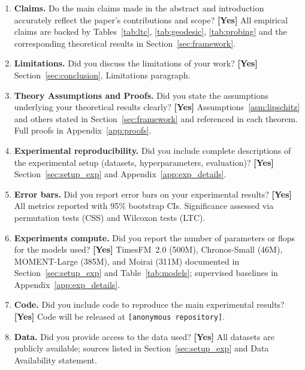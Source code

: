 \documentclass[10pt]{article}
\theoremstyle{definition}
\theoremstyle{remark}
\newcommand{\answerYes}[1]{\textbf{[Yes]} #1}
\begin{document}
\begin{enumerate}
  \setlength{\itemsep}{4pt}

\item \textbf{Claims.}
  Do the main claims made in the abstract and introduction accurately reflect
  the paper's contributions and scope?
  \answerYes{All empirical claims are backed by Tables~\ref{tab:ltc},
  \ref{tab:geodesic}, \ref{tab:probing} and the corresponding theoretical
  results in Section~\ref{sec:framework}.}

\item \textbf{Limitations.}
  Did you discuss the limitations of your work?
  \answerYes{Section~\ref{sec:conclusion}, Limitations paragraph.}

\item \textbf{Theory Assumptions and Proofs.}
  Did you state the assumptions underlying your theoretical results clearly?
  \answerYes{Assumptions~\ref{asm:lipschitz} and others stated in
  Section~\ref{sec:framework} and referenced in each theorem.
  Full proofs in Appendix~\ref{app:proofs}.}

\item \textbf{Experimental reproducibility.}
  Did you include complete descriptions of the experimental setup
  (datasets, hyperparameters, evaluation)?
  \answerYes{Section~\ref{sec:setup_exp} and Appendix~\ref{app:exp_details}.}

\item \textbf{Error bars.}
  Did you report error bars on your experimental results?
  \answerYes{All metrics reported with 95\% bootstrap CIs.
  Significance assessed via permutation tests (CSS) and Wilcoxon tests (LTC).}

\item \textbf{Experiments compute.}
  Did you report the number of parameters or flops for the models used?
  \answerYes{TimesFM~2.0 (500M), Chronos-Small (46M), MOMENT-Large (385M), and
  Moirai (311M) documented in Section~\ref{sec:setup_exp} and
  Table~\ref{tab:models}; supervised baselines in
  Appendix~\ref{app:exp_details}.}

\item \textbf{Code.}
  Did you include code to reproduce the main experimental results?
  \answerYes{Code will be released at \texttt{[anonymous repository]}.}

\item \textbf{Data.}
  Did you provide access to the data used?
  \answerYes{All datasets are publicly available; sources listed in
  Section~\ref{sec:setup_exp} and Data Availability statement.}


\end{enumerate}
\end{document}
